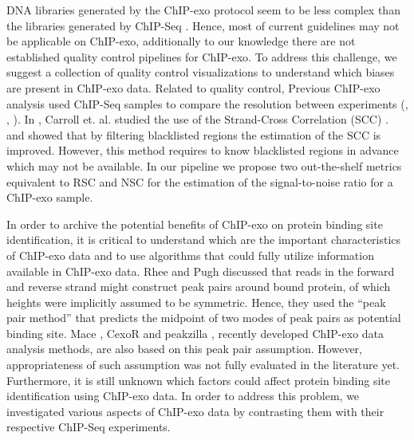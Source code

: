 \documentclass{bmcart}\usepackage[]{graphicx}\usepackage[]{color}
\begin{document}
DNA libraries generated by the ChIP-exo protocol seem to be less
complex than the libraries generated by ChIP-Seq
\cite{exo_review}. Hence, most of current guidelines \cite{encode_qc}
may not be applicable on ChIP-exo, additionally to our knowledge there
are not established quality control pipelines for ChIP-exo. To address
this challenge, we suggest a collection of quality control
visualizations to understand which biases are present in ChIP-exo
data. Related to quality control, Previous ChIP-exo analysis used
ChIP-Seq samples to compare the resolution between experiments
(\cite{exo1}, \cite{exo2}, \cite{exoillumina}). In \cite{carroll.qc},
Carroll et. al. studied the use of the Strand-Cross Correlation (SCC)
\cite{strandcc}. and showed that by filtering blacklisted regions the
estimation of the SCC is improved. However, this method requires to
know blacklisted regions in advance which may not be available. In our
pipeline we propose two out-the-shelf metrics equivalent to RSC and
NSC for the estimation of the signal-to-noise ratio for a ChIP-exo
sample.

In order to archive the potential benefits of ChIP-exo on protein
binding site identification, it is critical to understand which are
the important characteristics of ChIP-exo data and to use algorithms
that could fully utilize information available in ChIP-exo data. Rhee
and Pugh \cite{exo1} discussed that reads in the forward and reverse
strand might construct peak pairs around bound protein, of which
heights were implicitly assumed to be symmetric. Hence, they used the
``peak pair method'' that predicts the midpoint of two modes of peak
pairs as potential binding site. Mace \cite{mace}, CexoR \cite{cexor}
and peakzilla \cite{peakzilla}, recently developed ChIP-exo data
analysis methods, are also based on this peak pair
assumption. However, appropriateness of such assumption was not fully
evaluated in the literature yet.  Furthermore, it is still unknown
which factors could affect protein binding site identification using
ChIP-exo data. In order to address this problem, we investigated
various aspects of ChIP-exo data by contrasting them with their
respective ChIP-Seq experiments.
\end{document}
